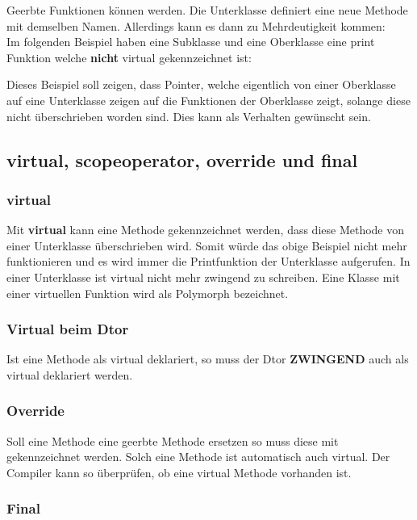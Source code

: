 Geerbte Funktionen können  werden. 
Die Unterklasse definiert eine neue Methode mit demselben Namen.
Allerdings kann es dann zu Mehrdeutigkeit kommen:\\
Im folgenden Beispiel haben eine Subklasse und eine Oberklasse eine print Funktion welche \textbf{nicht} virtual gekennzeichnet ist:



Dieses Beispiel soll zeigen, dass Pointer, welche eigentlich von einer Oberklasse auf eine Unterklasse zeigen auf die  Funktionen der Oberklasse zeigt, solange diese nicht überschrieben worden sind.
Dies kann als Verhalten gewünscht sein. 

\subsection{virtual, scopeoperator, override und final}

\subsubsection{virtual}\label{Virtual}

Mit \textbf{virtual} kann eine Methode gekennzeichnet werden, dass diese Methode von einer Unterklasse überschrieben wird.
Somit würde das obige Beispiel nicht mehr funktionieren und es wird immer die Printfunktion der Unterklasse aufgerufen. 
In einer Unterklasse ist virtual nicht mehr zwingend zu schreiben.
Eine Klasse mit einer virtuellen Funktion wird als Polymorph bezeichnet.

\subsubsection{Virtual beim Dtor}

Ist eine Methode als virtual deklariert, so muss der Dtor \textbf{ZWINGEND} auch als virtual deklariert werden.

\subsubsection{Override}

Soll eine Methode eine geerbte Methode ersetzen so muss diese mit  gekennzeichnet werden. 
Solch eine Methode ist automatisch auch virtual.
Der Compiler kann so überprüfen, ob eine virtual Methode vorhanden ist.

\subsubsection{Final}


